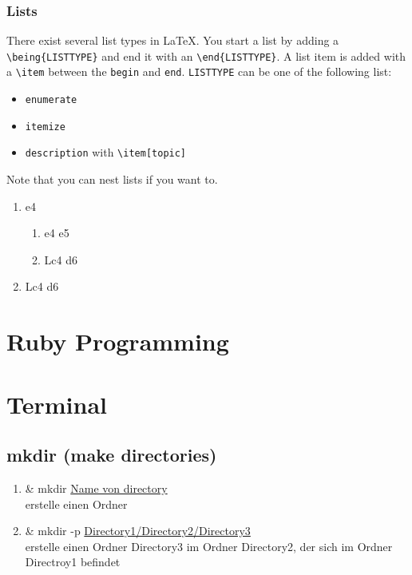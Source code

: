 \documentclass[10pt,a4paper]{scrartcl}
\begin{document}
\subsubsection{Lists}
There exist several list types in \LaTeX. You start a list by adding a 
\verb$\being{LISTTYPE}$ and end it with an \verb$\end{LISTTYPE}$. A list item
is added with a \verb$\item$ between the \texttt{begin} and \texttt{end}.
\texttt{LISTTYPE} can be one of the following list:
\begin{itemize}
	\item \texttt{enumerate}
	\item \texttt{itemize}
	\item \texttt{description} with \verb$\item[topic]$
\end{itemize}
\noindent Note that you can nest lists if you want to.
\begin{enumerate}
	\item{e4} 	
		\begin{enumerate}
			\item{e4}   e5
			\item Lc4 d6
		\end{enumerate}
	\item Lc4 d6
\end{enumerate}


\section{Ruby Programming}
\section{Terminal}
\subsection{mkdir (make directories)}


\begin{enumerate} 
	\item & {mkdir \underline{Name von directory}}\\
		{\small{erstelle einen Ordner}}		
	\item & {mkdir -p \underline{Directory1/Directory2/Directory3}}\\
 		{\small{erstelle einen Ordner Directory3 im Ordner Directory2, der sich im Ordner Directroy1 befindet}}

\end{enumerate}
\end{document}
